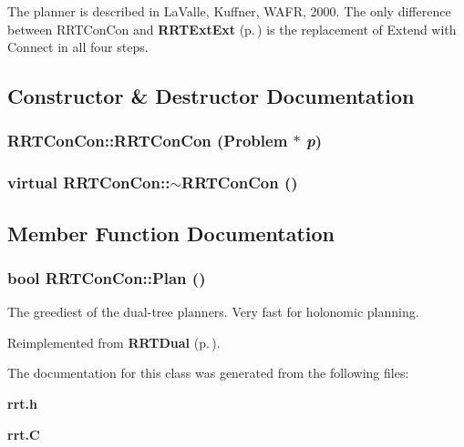 The planner is described in La\-Valle, Kuffner, WAFR, 2000. The only difference between RRTCon\-Con and {\bf RRTExt\-Ext} {\rm (p.\,\pageref{classRRTExtExt})} is the replacement of Extend with Connect in all four steps. 



\subsection{Constructor \& Destructor Documentation}
\subsubsection{\setlength{\rightskip}{0pt plus 5cm}RRTCon\-Con::RRTCon\-Con ({\bf Problem} $\ast$ {\em p})}\label{classRRTConCon_a0}


\subsubsection{\setlength{\rightskip}{0pt plus 5cm}virtual RRTCon\-Con::$\sim$RRTCon\-Con ()\hspace{0.3cm}{\tt  [inline, virtual]}}\label{classRRTConCon_a1}




\subsection{Member Function Documentation}
\subsubsection{\setlength{\rightskip}{0pt plus 5cm}bool RRTCon\-Con::Plan ()\hspace{0.3cm}{\tt  [virtual]}}\label{classRRTConCon_a2}


The greediest of the dual-tree planners. Very fast for holonomic planning.



Reimplemented from {\bf RRTDual} {\rm (p.\,\pageref{classRRTDual_a2})}.

The documentation for this class was generated from the following files:\begin{CompactItemize}
\item 
{\bf rrt.h}\item 
{\bf rrt.C}\end{CompactItemize}
